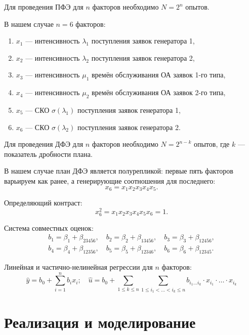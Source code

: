 \documentclass[a4paper, 14pt]{extreport}
\begin{document}
\begin{MainPart}
Для проведения ПФЭ для $n$ факторов необходимо $N = 2^n$ опытов.

В нашем случае $n = 6$ факторов:
\begin{enumerate}
	\item $x_1$ — интенсивность $\lambda_1$ поступления заявок генератора 1,
	\item $x_2$ — интенсивность $\lambda_2$ поступления заявок генератора 2,
	\item $x_3$ — интенсивность $\mu_1$ времён обслуживания ОА заявок 1-го типа,
	\item $x_4$ — интенсивность $\mu_2$ времён обслуживания ОА заявок 2-го типа,
	\item $x_5$ — СКО $\sigma(\lambda_1)$ поступления заявок генератора 1,
	\item $x_6$ — СКО $\sigma(\lambda_2)$ поступления заявок генератора 2.
\end{enumerate}

Для проведения ДФЭ для $n$ факторов необходимо $N = 2^{n - k}$ опытов, где $k$ — показатель дробности плана.

В нашем случае план ДФЭ является полурепликой: первые пять факторов варьируем как ранее, а генерирующие соотношения для последнего:
\begin{equation}
	x_6 = x_1x_2x_3x_4x_5.
\end{equation}

Определяющий контраст:
\begin{equation}
	x_6^2 = x_1x_2x_3x_4x_5x_6 = 1.
\end{equation}

Система совместных оценок:
\begin{gather*}
	b_1 = \beta_1 + \beta_{23456}, \quad
	b_2 = \beta_2 + \beta_{13456}, \quad
	b_3 = \beta_3 + \beta_{12456}, \\
	b_4 = \beta_4 + \beta_{12356}, \quad
	b_5 = \beta_5 + \beta_{12346}, \quad
	b_6 = \beta_6 + \beta_{12345}.
\end{gather*}

Линейная и частично-нелинейная регрессии для $n$ факторов:
\begin{equation}
	\hat y = b_0 + \sum_{i = 1}^{n}b_ix_i; \quad \hat u = b_0 + \sum_{1 \leqslant k \leqslant n}\sum_{1 \leqslant i_1 < \ldots < i_k \leqslant n}b_{i_1\ldots i_k}\cdot x_{i_1} \cdot \ldots \cdot x_{i_k}
\end{equation}

\section{Реализация и моделирование}




\end{MainPart}
\end{document}
